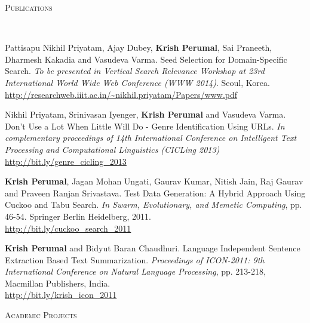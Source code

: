 \documentclass[11pt]{article}
\newenvironment{changemargin}[2]{%
  \begin{list}{}{%
    \setlength{\topsep}{0pt}%
    \setlength{\leftmargin}{#1}%
    \setlength{\rightmargin}{#2}%
    \setlength{\listparindent}{\parindent}%
    \setlength{\itemindent}{\parindent}%
    \setlength{\parsep}{\parskip}%
  }%
  \item[]}{\end{list}
}
\newcommand{\lineover}{
	\begin{changemargin}{-0.05in}{-0.05in}
		\vspace*{-8pt}
		\hrulefill \\
		\vspace*{-2pt}
	\end{changemargin}
}
\newcommand{\header}[1]{
	\begin{changemargin}{-0.5in}{-0.5in}
		\scshape{#1}\\
  	\lineover
	\end{changemargin}
}
\newenvironment{body} {
	\vspace*{-16pt}
	\begin{changemargin}{-0.25in}{-0.5in}
  }	
	{\end{changemargin}
}
\begin{document}
\smallskip


\header{Publications}

\begin{body}

	\vspace{14pt}
	Pattisapu Nikhil Priyatam, Ajay Dubey, \textbf{Krish Perumal}, Sai Praneeth, Dharmesh Kakadia and Vasudeva Varma. Seed Selection for Domain-Specific Search. 
\emph{To be presented in Vertical Search Relevance Workshop at 23rd International World Wide Web Conference (WWW 2014)}. Seoul, Korea. \\ \url{http://researchweb.iiit.ac.in/~nikhil.priyatam/Papers/www.pdf}

	\medskip

	\vspace{14pt}
	Nikhil Priyatam, Srinivasan Iyenger, \textbf{Krish Perumal} and Vasudeva Varma. Don't Use a Lot When Little Will Do - Genre Identification Using URLs. 
\emph{In complementary proceedings of 14th International Conference on Intelligent Text Processing and Computational Linguistics (CICLing 2013)} \\ \url{http://bit.ly/genre_cicling_2013}
	
	\medskip
	
	\textbf{Krish Perumal}, Jagan Mohan Ungati, Gaurav Kumar, Nitish Jain, Raj Gaurav and Praveen Ranjan Srivastava. Test Data Generation: A Hybrid Approach Using Cuckoo and Tabu Search. \emph{In Swarm, Evolutionary, and Memetic Computing}, pp. 46-54. Springer Berlin Heidelberg, 2011.\\ \url{http://bit.ly/cuckoo_search_2011}
	
	\medskip
	
	\textbf{Krish Perumal} and Bidyut Baran Chaudhuri. Language Independent Sentence Extraction Based Text Summarization. \emph{Proceedings of ICON-2011: 9th International Conference on Natural Language Processing}, pp. 213-218, Macmillan Publishers, India. \\
	\url{http://bit.ly/krish_icon_2011}
\end{body}

\smallskip

\header{Academic Projects}
\end{document}
